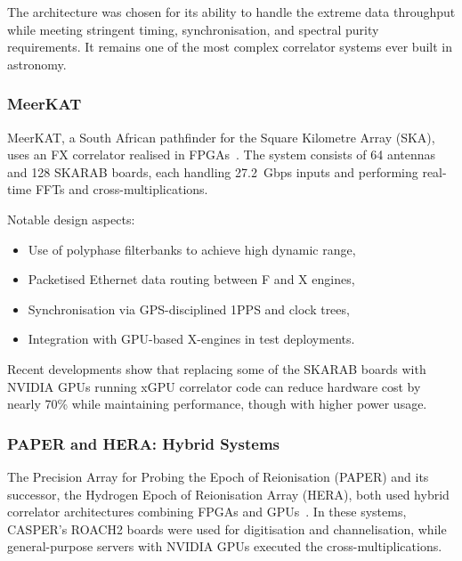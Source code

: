         The architecture was chosen for its ability to handle the extreme data throughput while meeting stringent timing, synchronisation, and spectral purity requirements. It remains one of the most complex correlator systems ever built in astronomy.

        \subsubsection{MeerKAT}
        MeerKAT, a South African pathfinder for the Square Kilometre Array (SKA), uses an FX correlator realised in FPGAs~\cite{Romein2021}. The system consists of 64 antennas and 128 SKARAB boards, each handling 27.2~Gbps inputs and performing real-time FFTs and cross-multiplications. 
        
        Notable design aspects:
        
        \begin{itemize}
            \item Use of polyphase filterbanks to achieve high dynamic range,
            
            \item Packetised Ethernet data routing between F and X engines,
            
            \item Synchronisation via GPS-disciplined 1PPS and clock trees,
            
            \item Integration with GPU-based X-engines in test deployments.
        \end{itemize}

        Recent developments show that replacing some of the SKARAB boards with NVIDIA GPUs running xGPU correlator code can reduce hardware cost by nearly 70\% while maintaining performance, though with higher power usage.

        \subsubsection{PAPER and HERA: Hybrid Systems}
        The Precision Array for Probing the Epoch of Reionisation (PAPER) and its successor, the Hydrogen Epoch of Reionisation Array (HERA), both used hybrid correlator architectures combining FPGAs and GPUs~\cite{Kocz2014}. In these systems, CASPER’s ROACH2 boards were used for digitisation and channelisation, while general-purpose servers with NVIDIA GPUs executed the cross-multiplications.

